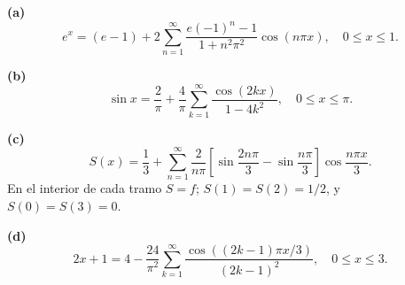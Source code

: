 \noindent\textbf{(a)} \[e^x=(e-1)+2\sum_{n=1}^{\infty}\frac{e(-1)^n-1}{1+n^2\pi^2}\cos(n\pi x),\quad0\le x\le1.\]

\noindent\textbf{(b)} \[\sin x=\frac2\pi+\frac4\pi\sum_{k=1}^{\infty}\frac{\cos(2kx)}{1-4k^2},\quad0\le x\le\pi.\]

\noindent\textbf{(c)} \[S(x)=\frac13+\sum_{n=1}^{\infty}\frac2{n\pi}
\left[\sin\frac{2n\pi}{3}-\sin\frac{n\pi}{3}\right]\cos\frac{n\pi x}{3}.\]
En el interior de cada tramo \(S=f\); \(S(1)=S(2)=1/2\), y \(S(0)=S(3)=0\).

\noindent\textbf{(d)} \[2x+1=4-\frac{24}{\pi^2}\sum_{k=1}^{\infty}
\frac{\cos((2k-1)\pi x/3)}{(2k-1)^2},\quad0\le x\le3.\]

